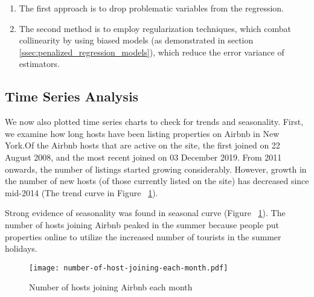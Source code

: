 \begin{enumerate}
    \item The first approach is to drop problematic variables from the regression.
    \item The second method is to employ regularization techniques, which combat
        collinearity by using biased models (as demonstrated in section \ref{ssec:penalized_regression_models}),
        which reduce the error variance of estimators.
\end{enumerate}

\subsection{Time Series Analysis}
\label{sec:time_series}

We now also plotted time series charts to check for trends and seasonality.
First, we examine how long hosts have been listing properties on Airbnb in New
York.Of the Airbnb hosts that are active on the site, the first joined on 22
August 2008, and the most recent joined on 03 December 2019.
From 2011 onwards, the number of listings started growing considerably. However,
growth in the number of new hosts (of those currently listed on the site) has
decreased since mid-2014 (The trend curve in Figure
~\ref{fig:number_of_hosts_joining}).

Strong evidence of seasonality was found in  seasonal curve (Figure
~\ref{fig:number_of_hosts_joining}). The number of hosts joining Airbnb peaked in
the summer because people put properties online to utilize the increased number
of tourists in the summer holidays.






\begin{figure}[H] \centering
    \texttt{[image: number-of-host-joining-each-month.pdf]}
    \caption{Number of hosts joining Airbnb each month}
    \label{fig:number_of_hosts_joining}
\end{figure}

